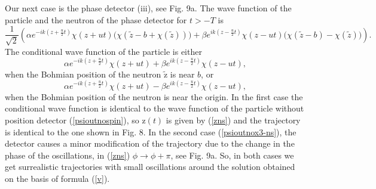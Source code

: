 \documentclass[12pt,preprint,tightenlines]{elsarticle}
\begin{document}
Our next case is the phase detector (iii), see Fig. 9a. The wave function of the
particle and the neutron of the phase detector for $t>-T$ is
 \begin{equation}
\frac{1}{\sqrt{2}}\left(\alpha e^{-ik(z+\frac{u}{2}t)}\chi(z+ut)\Big(\chi(\tilde{z}-b+\chi(\tilde{z}))\Big)+\beta e^{ik(z-\frac{u}{2}t)}\chi(z-ut)\Big(\chi(\tilde{z}-b)-\chi(\tilde{z})\Big)\right).\label{psioutnox3ns}
\end{equation}
 The conditional wave function of the particle is either
  \begin{equation}
\alpha e^{-ik(z+\frac{u}{2}t)}\chi(z+ut)+\beta e^{ik(z-\frac{u}{2}t)}\chi(z-ut),\label{psioutnox3+ns}
\end{equation}
 when the Bohmian position of the neutron $\tilde{\mathrm{z}}$ is near $b$, or
 \begin{equation}
\alpha e^{-ik(z+\frac{u}{2}t)}\chi(z+ut)-\beta e^{ik(z-\frac{u}{2}t)}\chi(z-ut),\label{psioutnox3-ns}
\end{equation}
 when the Bohmian position of the neutron is near the origin. In the first
case the conditional wave function is identical to the wave function
of the particle without position detector (\ref{psioutnospin}),
so $\mathrm{z}(t)$ is given by (\ref{zns}) and the trajectory is identical to the one shown in Fig. 8.
In the second case (\ref{psioutnox3-ns}), the detector causes
a minor modification of the trajectory due to the change in the phase of  the oscillations,
in (\ref{zns}) $\phi\rightarrow\phi+\pi$, see Fig. 9a. So, in both cases we get surrealistic
trajectories with small oscillations around the solution obtained on the basis of formula (\ref{v}).
\end{document}
